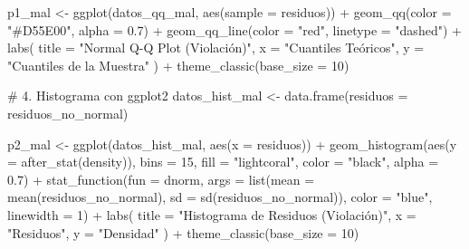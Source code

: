 \documentclass[
  letterpaper,
  DIV=11,
  numbers=noendperiod]{scrreprt}
\newenvironment{Shaded}{\begin{snugshade}}{\end{snugshade}}
\newcommand{\AttributeTok}[1]{\textcolor[rgb]{0.40,0.45,0.13}{#1}}
\newcommand{\CommentTok}[1]{\textcolor[rgb]{0.37,0.37,0.37}{#1}}
\newcommand{\DecValTok}[1]{\textcolor[rgb]{0.68,0.00,0.00}{#1}}
\newcommand{\FloatTok}[1]{\textcolor[rgb]{0.68,0.00,0.00}{#1}}
\newcommand{\FunctionTok}[1]{\textcolor[rgb]{0.28,0.35,0.67}{#1}}
\newcommand{\NormalTok}[1]{\textcolor[rgb]{0.00,0.23,0.31}{#1}}
\newcommand{\OtherTok}[1]{\textcolor[rgb]{0.00,0.23,0.31}{#1}}
\newcommand{\SpecialCharTok}[1]{\textcolor[rgb]{0.37,0.37,0.37}{#1}}
\newcommand{\StringTok}[1]{\textcolor[rgb]{0.13,0.47,0.30}{#1}}
\begin{document}
\begin{tcolorbox}
\begin{Shaded}
\begin{Highlighting}[]
\NormalTok{p1\_mal }\OtherTok{\textless{}{-}} \FunctionTok{ggplot}\NormalTok{(datos\_qq\_mal, }\FunctionTok{aes}\NormalTok{(}\AttributeTok{sample =}\NormalTok{ residuos)) }\SpecialCharTok{+}
  \FunctionTok{geom\_qq}\NormalTok{(}\AttributeTok{color =} \StringTok{"\#D55E00"}\NormalTok{, }\AttributeTok{alpha =} \FloatTok{0.7}\NormalTok{) }\SpecialCharTok{+}
  \FunctionTok{geom\_qq\_line}\NormalTok{(}\AttributeTok{color =} \StringTok{"red"}\NormalTok{, }\AttributeTok{linetype =} \StringTok{"dashed"}\NormalTok{) }\SpecialCharTok{+}
  \FunctionTok{labs}\NormalTok{(}
    \AttributeTok{title =} \StringTok{"Normal Q{-}Q Plot (Violación)"}\NormalTok{,}
    \AttributeTok{x =} \StringTok{"Cuantiles Teóricos"}\NormalTok{,}
    \AttributeTok{y =} \StringTok{"Cuantiles de la Muestra"}
\NormalTok{  ) }\SpecialCharTok{+}
  \FunctionTok{theme\_classic}\NormalTok{(}\AttributeTok{base\_size =} \DecValTok{10}\NormalTok{)}

\CommentTok{\# 4. Histograma con ggplot2}
\NormalTok{datos\_hist\_mal }\OtherTok{\textless{}{-}} \FunctionTok{data.frame}\NormalTok{(}\AttributeTok{residuos =}\NormalTok{ residuos\_no\_normal)}

\NormalTok{p2\_mal }\OtherTok{\textless{}{-}} \FunctionTok{ggplot}\NormalTok{(datos\_hist\_mal, }\FunctionTok{aes}\NormalTok{(}\AttributeTok{x =}\NormalTok{ residuos)) }\SpecialCharTok{+}
  \FunctionTok{geom\_histogram}\NormalTok{(}\FunctionTok{aes}\NormalTok{(}\AttributeTok{y =} \FunctionTok{after\_stat}\NormalTok{(density)), }\AttributeTok{bins =} \DecValTok{15}\NormalTok{, }\AttributeTok{fill =} \StringTok{"lightcoral"}\NormalTok{, }
                 \AttributeTok{color =} \StringTok{"black"}\NormalTok{, }\AttributeTok{alpha =} \FloatTok{0.7}\NormalTok{) }\SpecialCharTok{+}
  \FunctionTok{stat\_function}\NormalTok{(}\AttributeTok{fun =}\NormalTok{ dnorm, }
                \AttributeTok{args =} \FunctionTok{list}\NormalTok{(}\AttributeTok{mean =} \FunctionTok{mean}\NormalTok{(residuos\_no\_normal), }\AttributeTok{sd =} \FunctionTok{sd}\NormalTok{(residuos\_no\_normal)),}
                \AttributeTok{color =} \StringTok{"blue"}\NormalTok{, }\AttributeTok{linewidth =} \DecValTok{1}\NormalTok{) }\SpecialCharTok{+}
  \FunctionTok{labs}\NormalTok{(}
    \AttributeTok{title =} \StringTok{"Histograma de Residuos (Violación)"}\NormalTok{,}
    \AttributeTok{x =} \StringTok{"Residuos"}\NormalTok{,}
    \AttributeTok{y =} \StringTok{"Densidad"}
\NormalTok{  ) }\SpecialCharTok{+}
  \FunctionTok{theme\_classic}\NormalTok{(}\AttributeTok{base\_size =} \DecValTok{10}\NormalTok{)}


\end{Highlighting}
\end{Shaded}
\end{tcolorbox}
\end{document}
